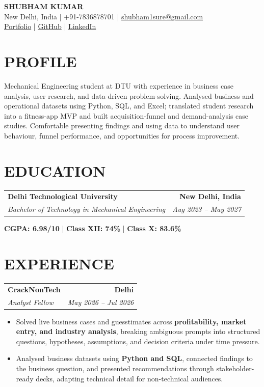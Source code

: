 \documentclass[10pt,a4paper]{article}
\makeatletter
\newcommand{\resumeSubheading}[4]{%
  \begin{tabular*}{\textwidth}{@{}l@{\extracolsep{\fill}}r@{}}
    \textbf{#1} & \textbf{#2} \\
    \textit{#3} & \textit{#4}
  \end{tabular*}\vspace{-3pt}
}
\makeatother
\begin{document}

\begin{center}
  {\LARGE\bfseries SHUBHAM KUMAR}\\[2pt]

  New Delhi, India \;|\; +91-7836878701 \;|\;
  \href{mailto:shubham1sure@gmail.com}{shubham1sure@gmail.com}\\[2pt]
  \href{https://nothing0g.github.io/analyst/}{Portfolio}
  \;|\;
  \href{https://github.com/Nothing0g}{GitHub}
  \;|\;
  \href{https://www.linkedin.com/in/shubham-kumar-diff/}{LinkedIn}
\end{center}

\vspace{-8pt}


\section*{PROFILE}
Mechanical Engineering student at DTU with experience in business case analysis,
user research, and data-driven problem-solving. Analysed business and operational
datasets using Python, SQL, and Excel; translated student research into a fitness-app
MVP and built acquisition-funnel and demand-analysis case studies. Comfortable
presenting findings and using data to understand user behaviour, funnel performance,
and opportunities for process improvement.


\section*{EDUCATION}

\resumeSubheading
  {Delhi Technological University}{New Delhi, India}
  {Bachelor of Technology in Mechanical Engineering}{Aug 2023 -- May 2027}
  \textbf{CGPA: 6.98/10} \quad | \quad
  \textbf{Class XII: 74\%} \quad | \quad
  \textbf{Class X: 83.6\%}


\section*{EXPERIENCE}

\resumeSubheading
  {CrackNonTech}{Delhi}
  {Analyst Fellow}{May 2026 -- Jul 2026}

\begin{itemize}
  \item Solved live business cases and guesstimates across
  \textbf{profitability, market entry, and industry analysis}, breaking
  ambiguous prompts into structured questions, hypotheses, assumptions,
  and decision criteria under time pressure.

  \item Analysed business datasets using \textbf{Python and SQL}, connected
  findings to the business question, and presented recommendations through
  stakeholder-ready decks, adapting technical detail for non-technical audiences.
\end{itemize}
\end{document}
